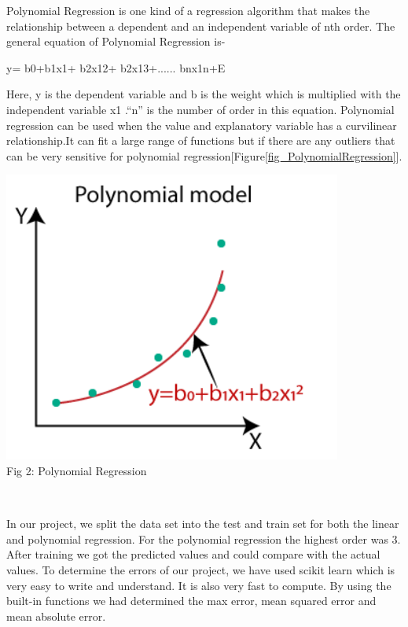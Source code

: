 \documentclass{IEEEtran}
\begin{document}
Polynomial Regression is one kind of a regression algorithm that makes the relationship between a dependent and an independent variable of nth order. The general equation of Polynomial Regression is-

y= b0+b1x1+ b2x12+ b2x13+...... bnx1n+E

Here, y is the dependent variable and b is the weight which is multiplied with the independent variable x1 \cite{Aa}.“n” is the number of order in this equation. Polynomial regression can be used when the value and explanatory variable has a curvilinear relationship\cite{Vaddi2020}.It can fit a large range of functions but if there are any outliers that can be very sensitive for polynomial regression\cite{Pant2019}[Figure\ref{fig_PolynomialRegression}].

\begin{left}
\centering
\includegraphics[scale=1]{polynomial.PNG}
\\\caption{Fig 2: Polynomial Regression}\\
\label{fig_PolynomialRegression}
\end{left}

In our project, we split the data set into the test and train set for both the linear and polynomial regression. For the polynomial regression the highest order was 3. After training we got the predicted values and could compare with the actual values. To determine the errors of our project, we have used scikit learn which is very easy to write and understand. It is also very fast to compute. By using the built-in functions we had determined the max error, mean squared error and mean absolute error. 
\end{document}
